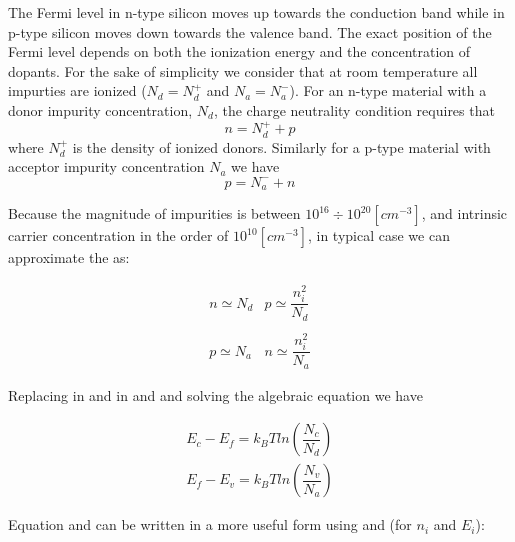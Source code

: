 The Fermi level in n-type silicon moves up towards the conduction band while in p-type silicon moves down towards the valence band.
The exact position of the Fermi level depends on both the ionization energy and the concentration of dopants. For the sake of simplicity we consider that at room temperature all impurties are ionized ($N_d = N_d^+$ and $N_a = N_a^-$).  For an n-type material with a donor impurity concentration, $N_d$, the charge neutrality condition requires that
\begin{equation}
\label{eq: equilibrium charge in n-type}
n = N_d^+ + p
\end{equation}
 where $N_d^+$ is the density of ionized donors.  Similarly for a p-type material with acceptor impurity concentration $N_a$ we have
\begin{equation}
\label{eq: equilibrium charge in p-type}
p = N_a^- + n
\end{equation}
 
 Because the magnitude of impurities is between $10^{16}\div 10^{20} [cm^{-3}]$, and intrinsic carrier concentration in the order of $10^{10}[cm^{-3}]$, in typical case we can approximate the  as:
  
\begin{equation}
\label{eq: equilibiurm approximation}
\begin{array}{ll}
n \simeq N_d & p \simeq \dfrac{n_i^2}{N_d} \\ \\
p \simeq N_a & n \simeq \dfrac{n_i^2}{N_a}
\end{array}
\end{equation}

Replacing  in   and  in  and  and solving the algebraic equation we have
 
 \begin{align}
 E_c-E_f = k_B Tln\left(\dfrac{N_c}{N_d}\right)  \label{eq: Ef in n-type}\\
 E_f-E_v= k_B Tln\left(\dfrac{N_v}{N_a}\right) \label{eq: Ef in p-type}
 \end{align}

Equation  and  can be written in a more useful form using  and  (for $n_i$ and $E_i$):

